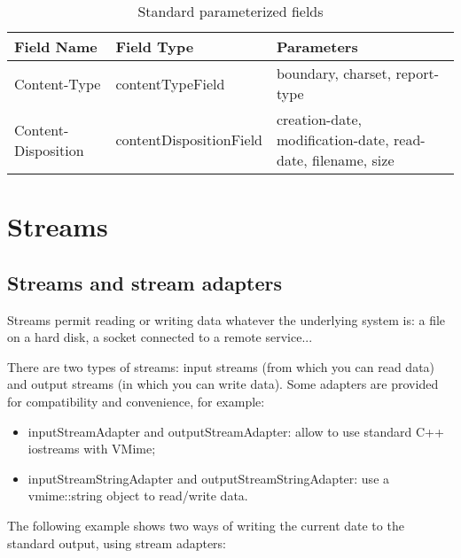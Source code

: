
\begin{table}[ht!]
\begin{center}
\noindent\begin{tabularx}{0.85\textwidth}{|l|l|X|}
\hline
	{\bf Field Name} &
	{\bf Field Type} &
	{\bf Parameters} \\
\hline
\hline
Content-Type & contentTypeField & boundary, charset, report-type  \\
\hline
Content-Disposition & contentDispositionField & creation-date,
modification-date, read-date, filename, size \\
\hline
\end{tabularx}
\end{center}
\label{standard-prm-fields}
\caption{Standard parameterized fields}
\end{table}



\section{Streams}

\subsection{Streams and stream adapters} %

Streams permit reading or writing data whatever the underlying system is:
a file on a hard disk, a socket connected to a remote service...

There are two types of streams: input streams (from which you can read data)
and output streams (in which you can write data). Some adapters are provided
for compatibility and convenience, for example:

\begin{itemize}
\item {\vcode inputStreamAdapter} and {\vcode outputStreamAdapter}: allow
to use standard C++ iostreams with VMime;
\item {\vcode inputStreamStringAdapter} and
{\vcode outputStreamStringAdapter}: use a {\vcode vmime::string} object to
read/write data.
\end{itemize}

The following example shows two ways of writing the current date to the
standard output, using stream adapters:

